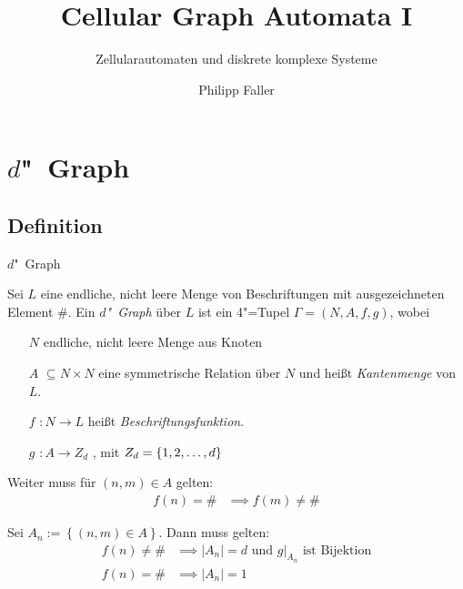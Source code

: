 \documentclass[18pt]{beamer}
\title[Cellular Graph Automata I]{Cellular Graph Automata I}
\subtitle{Zellularautomaten und diskrete komplexe Systeme}
\author{Philipp Faller}
\institute{Worsch}
\newcommand{\defWord}[1]{\emph{#1}}
\begin{document}

\begin{frame}
\titlepage
\end{frame}


\section{$d$"~Graph}
\subsection{Definition}
\begin{frame}{$d$"~Graph}
	\begin{definition}[$d$"~Graph]
		Sei $L$ eine endliche, nicht leere Menge von Beschriftungen mit ausgezeichneten Element $\#$. 
		Ein \defWord{$d$"~Graph} über $L$ ist ein 4"=Tupel $\Gamma = \left(N, A, f, g\right)$, wobei
		\begin{itemize}
			\item[$N$] endliche, nicht leere Menge aus Knoten 
			\item[$A$] $\subseteq N \times N$ eine symmetrische Relation über $N$ und heißt \defWord{Kantenmenge} von $L$.
			\item[$f$] $: N \rightarrow L$  heißt \defWord{Beschriftungsfunktion}.
			\item[$g$] $: A \rightarrow Z_d$ , mit $Z_d = \left \{1, 2,\text{\dots}, d \right \}$ 			
		\end{itemize}
	\end{definition}
\end{frame}

\begin{frame}
	\begin{definition}[]
		Weiter muss für $\left(n, m\right) \in A$ gelten:
		\begin{align*}
			f(n) = \# &\implies f(m) \neq \#
		\end{align*}
		
		Sei $A_n := \left \{\left(n, m\right) \in A\right \}$. Dann muss gelten:
		\begin{align*}
			f(n) \neq \# &\implies  \left|A_n\right| = d \text{ und } g \vert_{A_n} \text{ ist Bijektion} \\
			f(n) = \# &\implies\left|A_n\right| = 1
		\end{align*}
		
	\end{definition}
\end{frame}
\end{document}
